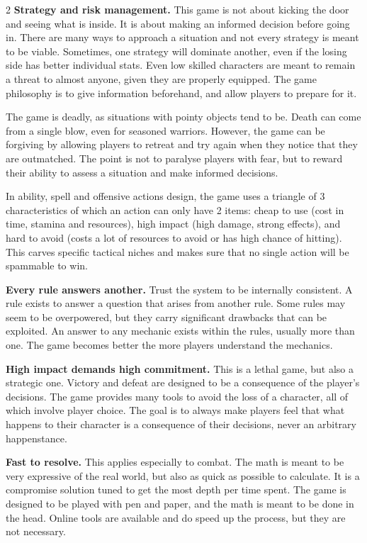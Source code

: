 \begin{multicols}{2}
\textbf{Strategy and risk management.} This game is not about kicking the door and seeing what is inside. It is about making an informed decision before going in. There are many ways to approach a situation and not every strategy is meant to be viable. Sometimes, one strategy will dominate another, even if the losing side has better individual stats. Even low skilled characters are meant to remain a threat to almost anyone, given they are properly equipped. The game philosophy is to give information beforehand, and allow players to prepare for it. 

The game is deadly, as situations with pointy objects tend to be. Death can come from a single blow, even for seasoned warriors. However, the game can be forgiving by allowing players to retreat and try again when they notice that they are outmatched. The point is not to paralyse players with fear, but to reward their ability to assess a situation and make informed decisions.

In ability, spell and offensive actions design, the game uses a triangle of 3 characteristics of which an action can only have 2 items: cheap to use (cost in time, stamina and resources), high impact (high damage, strong effects), and hard to avoid (costs a lot of resources to avoid or has high chance of hitting). This carves specific tactical niches and makes sure that no single action will be spammable to win.

\textbf{Every rule answers another.} Trust the system to be internally consistent. A rule exists to answer a question that arises from another rule. Some rules may seem to be overpowered, but they carry significant drawbacks that can be exploited. An answer to any mechanic exists within the rules, usually more than one. The game becomes better the more players understand the mechanics.

\textbf{High impact demands high commitment.} This is a lethal game, but also a strategic one. Victory and defeat are designed to be a consequence of the player's decisions. The game provides many tools to avoid the loss of a character, all of which involve player choice. The goal is to always make players feel that what happens to their character is a consequence of their decisions, never an arbitrary happenstance. 

\textbf{Fast to resolve.} This applies especially to combat. The math is meant to be very expressive of the real world, but also as quick as possible to calculate. It is a compromise solution tuned to get the most depth per time spent. The game is designed to be played with pen and paper, and the math is meant to be done in the head. Online tools are available and do speed up the process, but they are not necessary.


\end{multicols}
